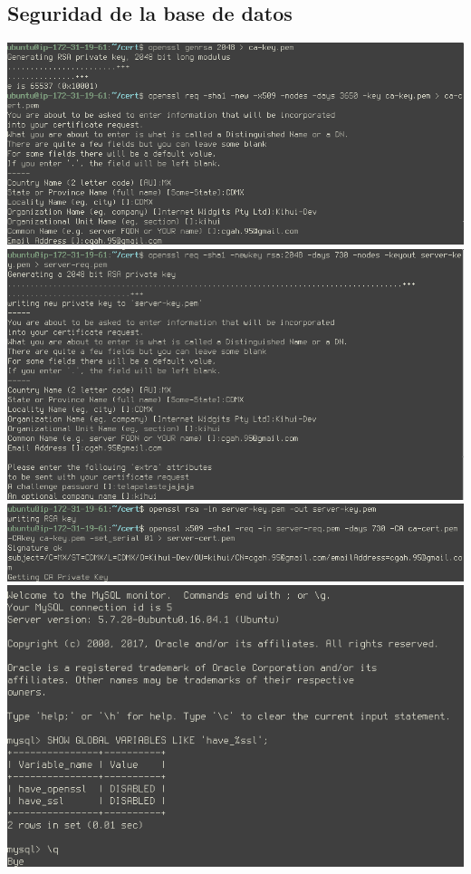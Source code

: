 \documentclass[9pt]{article}
\begin{document}
\subsection{Seguridad de la base de datos}
\includegraphics[width=\textwidth]{mysql_cert}
\includegraphics[width=\textwidth]{mysql_server-key}
\includegraphics[width=\textwidth]{mysql_server-cert}
\includegraphics[width=\textwidth]{mysql_ssl-disabled}
\end{document}
